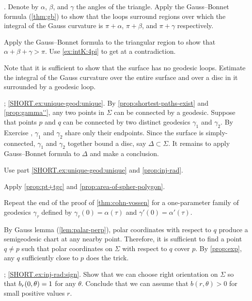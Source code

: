 .
Denote by $\alpha$, $\beta$, and $\gamma$ the angles of the triangle.
Apply the Gauss--Bonnet formula (\ref{thm:gb}) to show that the loops surround regions over which the integral of the Gauss curvature is $\pi+\alpha$, $\pi+\beta$, and $\pi+\gamma$ respectively.

Apply the Gauss--Bonnet formula to the triangular region to show that $\alpha+\beta+\gamma>\pi$.
Use \ref{ex:intK:4pi} to get at a contradiction.

 Note that it is sufficient to show that the surface has no geodesic loops.
Estimate the integral of the Gauss curvature over the entire surface and over a disc in it surrounded by a geodesic loop.

\parbf{\ref{ex:unique-geod}}; \ref{SHORT.ex:unique-geod:unique}.
By \ref{prop:shortest-paths-exist} and \ref{prop:gamma''}, any two points in $\Sigma$ can be connected by a geodesic.
Suppose that points $p$ and $q$ can be connected by two distinct geodesics $\gamma_1$ and $\gamma_2$.
By Exercise  \label{ex:two-min-geod}, $\gamma_1$ and $\gamma_2$ share only their endpoints.
Since the surface is simply-connected, $\gamma_1$ and $\gamma_2$ together bound a disc, say $\Delta\subset\Sigma$.
It remains to apply Gauss--Bonnet formula to $\Delta$ and make a conclusion.
 
Use part \ref{SHORT.ex:unique-geod:unique} and \ref{prop:inj-rad}.

Apply \ref{prop:pt+tgc} and \ref{prop:area-of-spher-polygon}.

 Repeat the end of the proof of \ref{thm:cohn-vossen} for a one-parameter family of geodesics $\gamma_\tau$ defined by $\gamma_\tau(0)=\alpha(\tau)$ and $\gamma'(0)=\alpha'(\tau)$. 

\setcounter{eqtn}{0}

By Gauss lemma (\ref{lem:palar-perp}), polar coordinates with respect to $q$ produce a semigeodesic chart at any nearby point.
Therefore, it is sufficient to find a point $q\ne p$ such that polar coordinates on $\Sigma$ with respect to $q$ cover $p$.
By \ref{prop:exp}, any $q$ sufficiently close to $p$ does the trick.

\parbf{\ref{ex:inj-rad}}; \ref{SHORT.ex:inj-rad:sign}.
Show that we can choose right orientation on $\Sigma$ so that $b_r(0,\theta)\z=1$ for any $\theta$.
Conclude that we can assume that $b(r,\theta)>0$ for small positive values $r$.

